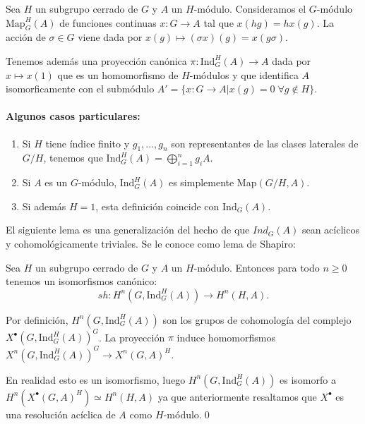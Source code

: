 \documentclass[a4paper,12pt, leqno]{article}
\begin{document}
Sea $H$ un subgrupo cerrado de $G$ y $A$ un $H$-módulo. Consideramos el $G$-módulo $\mathrm{Map}^H_G(A)$ de funciones continuas $x:G \rightarrow A$ tal que $x(hg)=hx(g)$. La acción de $\sigma \in G$ viene dada por $x(g)\mapsto (\sigma x)(g)=x(g \sigma)$.

Tenemos además una proyección canónica $\pi: \mathrm{Ind}^H_G(A) \rightarrow A$ dada por $x \mapsto x(1)$ que es un homomorfismo de $H$-módulos y que identifica $A$ isomorficamente con el submódulo $A'=\{x:G \rightarrow A|x(g)=0\;\forall g \notin H\}$.
\paragraph{Algunos casos particulares:}
\begin{enumerate}
	\item Si $H$ tiene índice finito y $g_1,...,g_n$ son representantes de las clases laterales de $G/H$, tenemos que $\mathrm{Ind}_G^H(A)=\bigoplus_{i=1}^n g_i A$.
	\item Si $A$ es un $G$-módulo, $\mathrm{Ind}_G^H(A)$ es simplemente Map$(G/H,A)$.
	\item Si además $H=1$, esta definición coincide con $\mathrm{Ind}_G(A)$.
\end{enumerate}
El siguiente lema es una generalización del hecho de que $Ind_G(A)$ sean acíclicos y cohomológicamente triviales. Se le conoce como lema de Shapiro:
\begin{prop}
	Sea $H$ un subgrupo cerrado de $G$ y $A$ un $H$-módulo. Entonces para todo $n\geq 0$ tenemos un isomorfismos canónico:
	\begin{equation*}
	sh:H^n(G,\mathrm{Ind}^H_G(A))\rightarrow H^n(H,A).
	\end{equation*}
\end{prop}
\begin{dem}
	Por definición, $H^n(G,\mathrm{Ind}^H_G(A))$ son los grupos de cohomología del complejo $X^{\bullet}(G,\mathrm{Ind}_G^H(A))^G$. La proyección $\pi$ induce homomorfismos $X^n(G,\mathrm{Ind}_G^H(A))^G \rightarrow X^n(G,A)^H$.
	
	
	En realidad esto es un isomorfismo, luego $H^n(G,\mathrm{Ind}^H_G(A))$ es isomorfo a $H^n(X^{\bullet}(G,A)^H)\simeq H^n(H,A)$ ya que anteriormente resaltamos que $X^{\bullet}$ es una resolución acíclica de $A$ como $H$-módulo.\qed
\end{dem}
\end{document}
